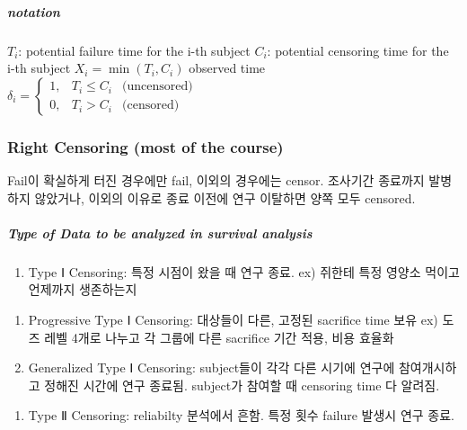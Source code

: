 \documentclass[
]{book}
\providecommand{\tightlist}{%
  \setlength{\itemsep}{0pt}\setlength{\parskip}{0pt}}
\begin{document}
{{{\hypertarget{notation-1}{%
\subparagraph{notation}\label{notation-1}}

\(T_i\): potential failure time for the i-th subject
\(C_i\): potential censoring time for the i-th subject
\(X_i = \min(T_i , C_i )\) observed time
\(\delta_i = \begin{cases} 1, & T_i \le C_i & \text{(uncensored)} \\ 0, & T_i > C_i & \text{(censored)} \end{cases}\)

\hypertarget{right-censoring-most-of-the-course}{%
\subsubsection{Right Censoring (most of the course)}\label{right-censoring-most-of-the-course}}

Fail이 확실하게 터진 경우에만 fail, 이외의 경우에는 censor. 조사기간 종료까지 발병하지 않았거나, 이외의 이유로 종료 이전에 연구 이탈하면 양쪽 모두 censored.

\hypertarget{type-of-data-to-be-analyzed-in-survival-analysis}{%
\subparagraph{Type of Data to be analyzed in survival analysis}\label{type-of-data-to-be-analyzed-in-survival-analysis}}

\begin{enumerate}
\def\labelenumi{\arabic{enumi}.}
\tightlist
\item
  Type Ⅰ Censoring:
  특정 시점이 왔을 때 연구 종료. ex) 쥐한테 특정 영양소 먹이고 언제까지 생존하는지
\end{enumerate}

\begin{enumerate}
\def\labelenumi{\arabic{enumi})}
\tightlist
\item
  Progressive Type Ⅰ Censoring: 대상들이 다른, 고정된 sacrifice time 보유 ex) 도즈 레벨 4개로 나누고 각 그룹에 다른 sacrifice 기간 적용, 비용 효율화
\item
  Generalized Type Ⅰ Censoring: subject들이 각각 다른 시기에 연구에 참여개시하고 정해진 시간에 연구 종료됨. subject가 참여할 때 censoring time 다 알려짐.
\end{enumerate}

\begin{enumerate}
\def\labelenumi{\arabic{enumi}.}
\setcounter{enumi}{1}
\tightlist
\item
  Type Ⅱ Censoring:
  reliabilty 분석에서 흔함. 특정 횟수 failure 발생시 연구 종료.
\end{enumerate}

}}}
\end{document}
